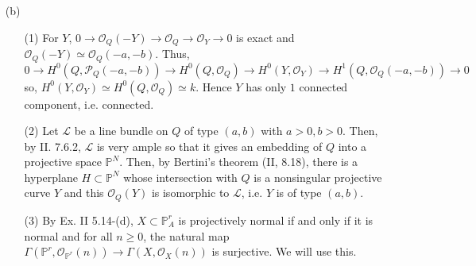 \documentclass[11pt]{amsart}          %
\newcommand{\calO}{\mathcal{O}}
\newcommand{\calL}{\mathcal{L}}
\newcommand{\calP}{\mathcal{P}}
\newcommand{\bbP}{\mathbb{P}}
\begin{document}
\begin{enumerate}
\begin{proof}
When $q \leq -2$, $H^0 (\bbP^1, \calO_{\bbP^1} (-1) ) = 0$ and $h^1 (\bbP^1 , \calO_{\bbP^1} (q)) = h^0 (\bbP^1, \calO_{\bbP^1} (-q-2)) >0$ so that $H^1 (0, q) \not = 0$. This proves (i) and by symmetry we also have $H^1 (p, 0) \not = 0$ if $p \leq -2$. This proves (3).

When $p = 1, q=0$, we have
$$k = H^0 (Q, \calO_Q) \overset{\simeq}{\to} H^0 (\bbP^1, \calO_{\bbP^1}) = k \to H^1 (Q, \calO_Q (-1, 0)) \to H^1 (Q, \calO_Q) = 0$$ so that $H^1(Q, \calO_Q (-1, 0)) = 0$. This proves (ii) and similarly we have $H^1 (Q, \calO_Q (0, -1)) = 0$.
\end{proof}

Now, we prove (2). From V. 1.4.4, the canonical line bundle $K \simeq \calO_Q (-2, -2)$, so, when $a,b<0$, by Serre duality, 
$$H^1(Q, \calO_Q (a,b)) \simeq H^1(Q, \calO_Q (-a-2, -b-2))^*.$$

If $a, b \leq -2$, then, by Claim 2, this group vanishes.

In case $(a,b) = (0, -1), (-1, 0), (-2, -1), (-1,-2), (-1,-1)$, the previous claims already show it. Hence, it is $0$ for any $a,b<0$. This proves (2). (1) is trivial once we have (2) and the previous claims. 

\item [(b)]
\begin{enumerate}
	\item [(1)] For $Y$, $0 \to \calO_Q (-Y) \to \calO_Q \to \calO_Y\to 0$ is exact and $\calO_Q (-Y) \simeq \calO_Q (-a, -b)$. Thus, 
	$$0 \to H^0 (Q, \calP_Q (-a, -b)) \to H^0 (Q, \calO_Q) \to H^0 (Y, \calO_Y) \to H^1(Q, \calO_Q (-a, -b)) \to 0$$ so, $H^0 (Y, \calO_Y) \simeq H^0 (Q, \calO_Q) \simeq k$. Hence $Y$ has only $1$ connected component, i.e. connected.
	
	\item [(2)] Let $\calL$ be a line bundle on $Q$ of type $(a,b)$ with $a>0, b>0$. Then, by II. 7.6.2, $\calL$ is very ample so that it gives an embedding of $Q$ into a projective space $\bbP^N$. Then, by Bertini's theorem (II, 8.18), there is a hyperplane $H \subset \bbP^N$ whose intersection with $Q$ is a nonsingular projective curve $Y$ and this $\calO_Q (Y)$ is isomorphic to $\calL$, i.e. $Y$ is of type $(a,b)$.
	
	\item [(3)] By Ex. II 5.14-(d), $X \subset \bbP_A ^r$ is projectively normal if and only if it is normal and for all $n \geq 0$, the natural map $\Gamma(\bbP^r, \calO_{\bbP^r} (n)) \to \Gamma(X, \calO_X (n))$ is surjective. We will use this.
	

\end{enumerate}
\end{enumerate}
\end{document}
